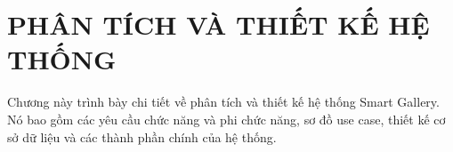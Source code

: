 \chapter{PHÂN TÍCH VÀ THIẾT KẾ HỆ THỐNG}

Chương này trình bày chi tiết về phân tích và thiết kế hệ thống Smart Gallery. Nó bao gồm các yêu cầu chức năng và phi chức năng, sơ đồ use case, thiết kế cơ sở dữ liệu và các thành phần chính của hệ thống. 







